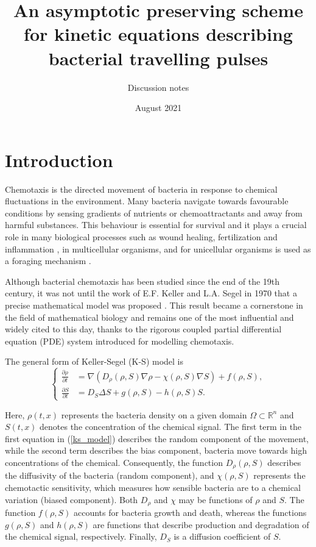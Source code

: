 \documentclass[11pt,twoside]{article}
\title{An asymptotic preserving scheme for kinetic equations describing bacterial travelling pulses}
\author{Discussion notes}
\date{August 2021}
\theoremstyle{nonumberplain}
\begin{document}
\maketitle



\section{Introduction}


Chemotaxis is the directed movement of bacteria in response to chemical fluctuations in the environment. Many bacteria navigate towards favourable conditions by sensing gradients of nutrients or chemoattractants and away from harmful substances. This behaviour is essential for survival \cite{franca2006navigating} and it plays a crucial role in many biological processes such as wound healing, fertilization and inflammation \cite{rickert2000leukocytes}, in multicellular organisms, and for unicellular organisms is used as a foraging mechanism \cite{willard2006signaling} \cite{franca2010g}.



Although bacterial chemotaxis has been studied since the end of the 19th century,  it was not until the work of E.F. Keller and L.A. Segel in 1970 that a precise mathematical model was proposed \cite{keller1971model}. This result became a cornerstone in the field of mathematical biology and remains one of the most influential and widely cited to this day, thanks to the rigorous coupled partial differential equation (PDE) system introduced for modelling chemotaxis.

The general form of Keller-Segel (K-S) model is
\begin{equation}
      \left \{
    \begin{aligned}
    \frac{\partial \rho}{\partial t} &= \nabla (D_\rho (\rho, S) \nabla \rho - \chi (\rho, S) \nabla S) + f(\rho, S), \\
    \frac{\partial S}{\partial t} &= D_S \Delta S + g (\rho, S) - h(\rho, S)S.
    \end{aligned}
  \right .
  \label{ks_model}
\end{equation}

Here, $\rho (t, x)$ represents the bacteria density on a given domain $\Omega \subset \mathbb{R}^n $ and $S(t, x)$ denotes the concentration of the chemical signal. The first term in the first equation in (\ref{ks_model}) describes the random component of the movement, while the second term describes the bias component, bacteria move towards high concentrations of the chemical. Consequently, the function $D_\rho (\rho, S)$ describes the diffusivity of the bacteria (random component), and $\chi (\rho,S)$ represents the chemotactic sensitivity, which measures how sensible bacteria are to a chemical variation (biased component). Both $D_\rho$ and $\chi$ may be functions of $\rho$ and $S$. The function $f(\rho, S)$ accounts for bacteria growth and death, whereas the functions $g(\rho, S)$ and $h(\rho, S)$ are functions that describe production and degradation of the chemical signal, respectively. Finally, $D_S$ is a diffusion coefficient of $S$.
\end{document}
